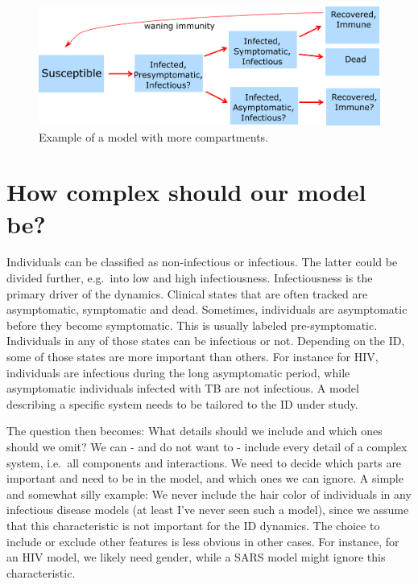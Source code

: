 \documentclass[]{book}
\theoremstyle{definition}
\theoremstyle{definition}
\theoremstyle{definition}
\theoremstyle{remark}
\begin{document}
\begin{figure}
\centering
\includegraphics{./images/ComplicatedModel.png}
\caption{\label{fig:complicatedmodel}Example of a model with more
compartments.}
\end{figure}

\section{How complex should our model
be?}\label{how-complex-should-our-model-be}

Individuals can be classified as non-infectious or infectious. The
latter could be divided further, e.g.~into low and high infectiousness.
Infectiousness is the primary driver of the dynamics. Clinical states
that are often tracked are asymptomatic, symptomatic and dead.
Sometimes, individuals are asymptomatic before they become symptomatic.
This is usually labeled pre-symptomatic. Individuals in any of those
states can be infectious or not. Depending on the ID, some of those
states are more important than others. For instance for HIV, individuals
are infectious during the long asymptomatic period, while asymptomatic
individuals infected with TB are not infectious. A model describing a
specific system needs to be tailored to the ID under study.

The question then becomes: What details should we include and which ones
should we omit? We can - and do not want to - include every detail of a
complex system, i.e.~all components and interactions. We need to decide
which parts are important and need to be in the model, and which ones we
can ignore. A simple and somewhat silly example: We never include the
hair color of individuals in any infectious disease models (at least
I've never seen such a model), since we assume that this characteristic
is not important for the ID dynamics. The choice to include or exclude
other features is less obvious in other cases. For instance, for an HIV
model, we likely need gender, while a SARS model might ignore this
characteristic.
\end{document}
